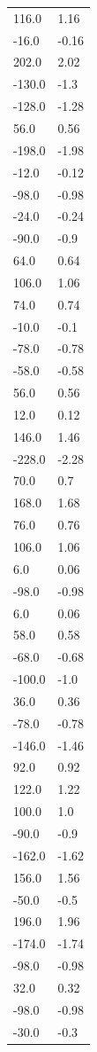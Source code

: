 \begin{longtable}{ll}
116.0 & 1.16 \\
-16.0 & -0.16 \\
202.0 & 2.02 \\
-130.0 & -1.3 \\
-128.0 & -1.28 \\
56.0 & 0.56 \\
-198.0 & -1.98 \\
-12.0 & -0.12 \\
-98.0 & -0.98 \\
-24.0 & -0.24 \\
-90.0 & -0.9 \\
64.0 & 0.64 \\
106.0 & 1.06 \\
74.0 & 0.74 \\
-10.0 & -0.1 \\
-78.0 & -0.78 \\
-58.0 & -0.58 \\
56.0 & 0.56 \\
12.0 & 0.12 \\
146.0 & 1.46 \\
-228.0 & -2.28 \\
70.0 & 0.7 \\
168.0 & 1.68 \\
76.0 & 0.76 \\
106.0 & 1.06 \\
6.0 & 0.06 \\
-98.0 & -0.98 \\
6.0 & 0.06 \\
58.0 & 0.58 \\
-68.0 & -0.68 \\
-100.0 & -1.0 \\
36.0 & 0.36 \\
-78.0 & -0.78 \\
-146.0 & -1.46 \\
92.0 & 0.92 \\
122.0 & 1.22 \\
100.0 & 1.0 \\
-90.0 & -0.9 \\
-162.0 & -1.62 \\
156.0 & 1.56 \\
-50.0 & -0.5 \\
196.0 & 1.96 \\
-174.0 & -1.74 \\
-98.0 & -0.98 \\
32.0 & 0.32 \\
-98.0 & -0.98 \\
-30.0 & -0.3 \\

\end{longtable}
